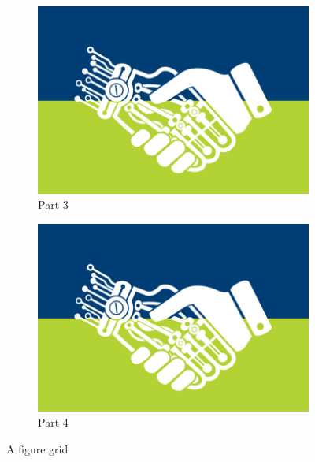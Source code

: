 \begin{figure}[ht]
\begin{multicols}{2}
\begin{subfigure}[b]{0.475\textwidth}
            \includegraphics[width=\textwidth]{img/bioeng.jpg}
            \caption{Part 3}  
        \end{subfigure}
        \hfill
        \begin{subfigure}[b]{0.475\textwidth}   
            \centering 
            \includegraphics[width=\textwidth]{img/bioeng.jpg}
            \caption{Part 4}    
        \end{subfigure}
        \label{fig:mean and std of nets}
        \end{multicols}
        \caption {A figure grid} 
        \label{fig:3}
    \end{figure}
